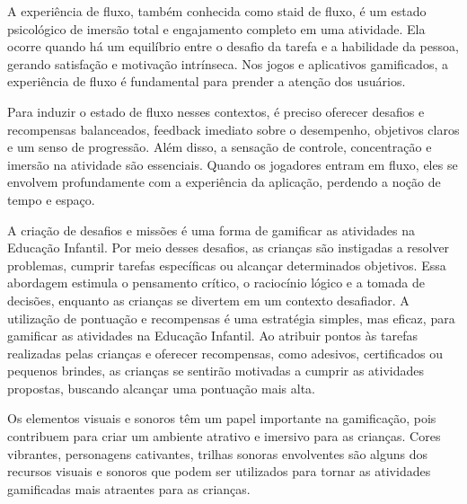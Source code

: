A experiência de fluxo, também conhecida como staid de fluxo, é um estado psicológico de imersão total e engajamento completo em uma atividade. Ela ocorre quando há um equilíbrio entre o desafio da tarefa e a habilidade da pessoa, gerando satisfação e motivação intrínseca. Nos jogos e aplicativos gamificados, a experiência de fluxo é fundamental para prender a atenção dos usuários.

Para induzir o estado de fluxo nesses contextos, é preciso oferecer desafios e recompensas balanceados, feedback imediato sobre o desempenho, objetivos claros e um senso de progressão. Além disso, a sensação de controle, concentração e imersão na atividade são essenciais. Quando os jogadores entram em fluxo, eles se envolvem profundamente com a experiência da aplicação, perdendo a noção de tempo e espaço.

A criação de desafios e missões é uma forma de gamificar as atividades na Educação Infantil. Por meio desses desafios, as crianças são instigadas a resolver problemas, cumprir tarefas específicas ou alcançar determinados objetivos. Essa abordagem estimula o pensamento crítico, o raciocínio lógico e a tomada de decisões, enquanto as crianças se divertem em um contexto desafiador. A utilização de pontuação e recompensas é uma estratégia simples, mas eficaz, para gamificar as atividades na Educação Infantil. Ao atribuir pontos às tarefas realizadas pelas crianças e oferecer recompensas, como adesivos, certificados ou pequenos brindes, as crianças se sentirão motivadas a cumprir as atividades propostas, buscando alcançar uma pontuação mais alta.

Os elementos visuais e sonoros têm um papel importante na gamificação, pois contribuem para criar um ambiente atrativo e imersivo para as crianças. Cores vibrantes, personagens cativantes, trilhas sonoras envolventes são alguns dos recursos visuais e sonoros que podem ser utilizados para tornar as atividades gamificadas mais atraentes para as crianças.





